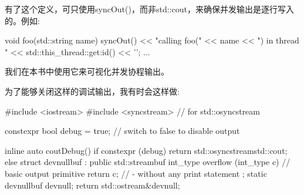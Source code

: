 有了这个定义，可只使用syncOut()，而非std::cout，来确保并发输出是逐行写入的。例如:

\begin{cpp}
void foo(std::string name) {
	syncOut() << "calling foo(" << name
			  << ") in thread " << std::this_thread::get:id() << '\n';
	...
}
\end{cpp}

我们在本书中使用它来可视化并发协程输出。

为了能够关闭这样的调试输出，我有时会这样做:

\begin{cpp}
#include <iostream>
#include <syncstream> // for std::osyncstream

constexpr bool debug = true; // switch to false to disable output

inline auto coutDebug() {
	if constexpr (debug) {
		return std::osyncstream{std::cout};
	}
	else {
		struct devnullbuf : public std::streambuf {
			int_type overflow (int_type c) { // basic output primitive
				return c; // - without any print statement
			}
		};
		static devnullbuf devnull;
		return std::ostream{&devnull};
	}
}
\end{cpp}
















